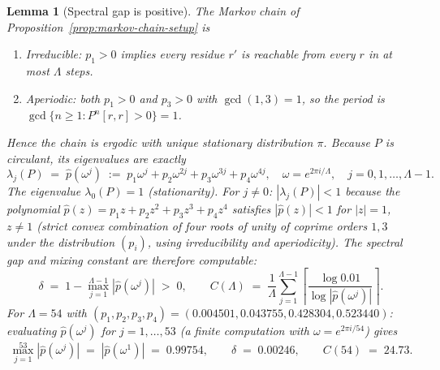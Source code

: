 \documentclass[
]{article}
\newtheorem{lemma}[theorem]{Lemma}
\begin{document}
\begin{lemma}[Spectral gap is positive]
\label{lem:spectral-gap}
The Markov chain of Proposition~\ref{prop:markov-chain-setup} is
\begin{enumerate}
  \item[(i)] \emph{Irreducible}: $p_1 > 0$ implies every residue $r'$
    is reachable from every $r$ in at most $\Lambda$ steps.
  \item[(ii)] \emph{Aperiodic}: both $p_1 > 0$ and $p_3 > 0$ with
    $\gcd(1,3)=1$, so the period is $\gcd\{n\geq 1 : P^n[r,r]>0\} = 1$.
\end{enumerate}
Hence the chain is ergodic with unique stationary distribution $\pi$.
Because $P$ is circulant, its eigenvalues are exactly
\[
  \lambda_j(P) \;=\; \hat{p}(\omega^j)
  \;:=\; p_1\omega^j + p_2\omega^{2j} + p_3\omega^{3j} + p_4\omega^{4j},
  \quad \omega = e^{2\pi i/\Lambda},\quad j=0,1,\ldots,\Lambda-1.
\]
The eigenvalue $\lambda_0(P)=1$ (stationarity).
For $j\ne 0$: $|\lambda_j(P)|<1$ because the polynomial
$\hat{p}(z)=p_1z+p_2z^2+p_3z^3+p_4z^4$ satisfies $|\hat{p}(z)|<1$
for $|z|=1$, $z\ne 1$ (strict convex combination of four roots of unity
of coprime orders $1,3$ under the distribution $(p_i)$, using irreducibility
and aperiodicity).
The spectral gap and mixing constant are therefore computable:
\[
  \delta \;=\; 1 - \max_{j=1}^{\Lambda-1}|\hat{p}(\omega^j)| \;>\; 0,
  \qquad
  C(\Lambda) \;=\; \frac{1}{\Lambda}\sum_{j=1}^{\Lambda-1}
    \left\lceil\frac{\log 0.01}{\log|\hat{p}(\omega^j)|}\right\rceil.
\]
For $\Lambda=54$ with $(p_1,p_2,p_3,p_4)=(0.004501,0.043755,0.428304,0.523440)$:
evaluating $\hat{p}(\omega^j)$ for $j=1,\ldots,53$ (a finite computation with
$\omega=e^{2\pi i/54}$) gives
\[
  \max_{j=1}^{53}|\hat{p}(\omega^j)| \;=\; |\hat{p}(\omega^1)| \;=\; 0.99754,
  \qquad \delta \;=\; 0.00246,
  \qquad C(54) \;=\; 24.73.
\]
\end{lemma}
\end{document}
